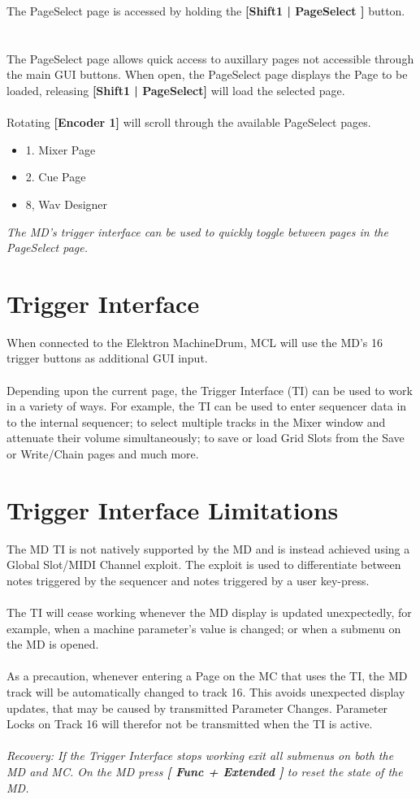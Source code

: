 The PageSelect page is accessed by holding the \textbf{[Shift1 | PageSelect ]} button.
\\
\\
\\
The PageSelect page allows quick access to auxillary pages not accessible through the main GUI buttons.
When open, the PageSelect page displays the Page to be loaded, releasing \textbf{[Shift1 | PageSelect]} will load
the selected page.
\\
\\Rotating \textbf{[Encoder 1]} will scroll through the available PageSelect pages.
\begin{itemize}
	\item{1. Mixer Page}
	\item{2. Cue Page}
    \item{8, Wav Designer}
\end{itemize}
\textit{The MD's trigger interface can be used to quickly toggle between pages in the PageSelect page. }
\section{Trigger Interface}
When connected to the Elektron MachineDrum, MCL will use the MD's 16 trigger buttons as additional GUI input. \\
\\
Depending upon the current page, the Trigger Interface (TI) can be used to work in a variety of ways.
For example, the TI can be used to enter sequencer data in to the internal sequencer;
to select multiple tracks in the Mixer window and attenuate their volume simultaneously; to save or load Grid Slots from the Save or Write/Chain pages and much more.

\section{Trigger Interface Limitations}
The MD TI is not natively supported by the MD and is instead achieved using a Global Slot/MIDI Channel exploit. The exploit is used to differentiate between notes triggered by the sequencer and notes triggered by a user key-press.\\
\\
The TI will cease working whenever the MD display is updated unexpectedly, for example, when a machine parameter's value is changed; or when a submenu on the MD is opened.\\
\\
As a precaution, whenever entering a Page on the MC that uses the TI, the MD track will be automatically changed to track 16. This avoids unexpected display updates, that may be caused 
by transmitted Parameter Changes. Parameter Locks on Track 16 will therefor not be transmitted when the TI is active.\\
\\
\textit{Recovery: If the Trigger Interface stops working exit all submenus on both the MD and MC. On the MD press \textbf{[ Func + Extended ]} to reset the state of the MD.}





